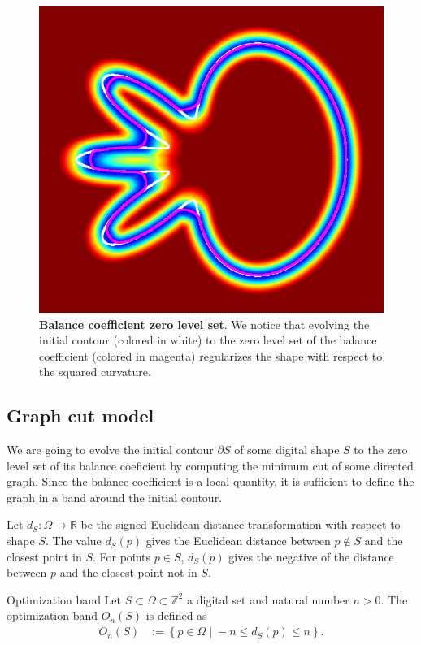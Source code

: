\documentclass[smallextended]{svjour3}
\begin{document}
\begin{figure}
 \center
 \includegraphics[scale=0.32]{figures/zero-level-set/balance-coefficient-zero-level-set.png}
 \caption{\textbf{Balance coefficient zero level set}. We notice that evolving the initial contour (colored in white) to the zero level set of the balance coefficient (colored in magenta) regularizes the shape with respect to the squared curvature.}
 \label{fig:balance-coefficient-zero-level-set}
 \end{figure}
 
\subsection{Graph cut model}

We are going to evolve the initial contour $\partial S$ of some digital shape $S$ to the zero level set of its balance coeficient by computing the minimum cut of some directed graph. Since the balance coefficient is a local quantity, it is sufficient to define the graph in a band around the initial contour.

Let $d_{S}:\Omega \rightarrow \mathbb{R}$ be the signed Euclidean distance transformation with respect to shape $S$. The value $d_{S}(p)$ gives the Euclidean distance between $p \notin S$ and the closest point in $S$. For points $p \in S$, $d_{S}(p)$ gives the negative of the distance between $p$ and the closest point not in $S$.

\begin{definition}{Optimization band}
Let $S \subset \Omega \subset \mathbb{Z}^2$ a digital set and natural number $n>0$. The optimization band $O_n(S)$ is defined as
\begin{align*}
	O_n(S) &:=\left\{ p \in \Omega \; | \; -n \leq d_{S}(p) \leq n \right\}.
\end{align*}
\end{definition}
\end{document}
